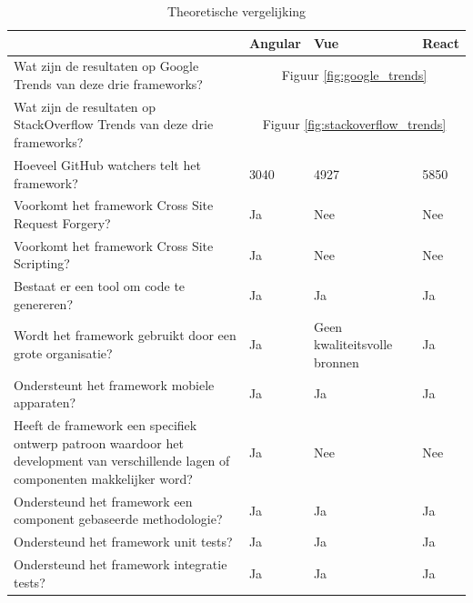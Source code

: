 \begin{table}[h]
	\centering
	\caption{Theoretische vergelijking}
	\label{table:theoretische_vergelijking}
	\begin{tabular}{|p{7cm}||p{2cm}|p{2cm}|p{2cm}|}
		\hline
		&Angular &Vue   &React \\ \hline \hline
		Wat zijn de resultaten op Google Trends van deze drie frameworks?
		&\multicolumn{3}{c|}{Figuur \ref{fig:google_trends}}\\ \hline
		Wat zijn de resultaten op StackOverflow Trends van deze drie frameworks?
		&\multicolumn{3}{c|}{Figuur \ref{fig:stackoverflow_trends}}\\ \hline
		Hoeveel GitHub watchers telt het framework? \autocite{github_front-end_????} 
		&3040     &4927  &5850 \\ \hline
		Voorkomt het framework Cross Site Request Forgery? \autocite{_angular_2018-1}
		&Ja         &Nee    &Nee \\ \hline
		Voorkomt het framework Cross Site Scripting? \autocite{_angular_2018-1}
		&Ja         &Nee    &Nee \\ \hline
		Bestaat er een tool om code te genereren?
		&Ja         &Ja     &Ja       \\ \hline
		Wordt het framework gebruikt door een grote organisatie? \autocite{_made_????} \autocite{_made_????-1}
		&Ja         &Geen kwaliteitsvolle bronnen &Ja \\ \hline
		Ondersteunt het framework mobiele apparaten?
		&Ja         &Ja     &Ja       \\ \hline
		Heeft de framework een specifiek ontwerp patroon waardoor het development van verschillende lagen of componenten makkelijker word?
		&Ja         &Nee   &Nee       \\ \hline
		Ondersteund het framework een component gebaseerde methodologie?
		&Ja         &Ja     &Ja       \\ \hline
		Ondersteund het framework unit tests? \autocite{_testing_2018} \autocite{_testing_2018-2} \autocite{_testing_2018-1}
		&Ja         &Ja     &Ja       \\ \hline
		Ondersteund het framework integratie tests?
		&Ja         &Ja     &Ja      \\  \hline
	\end{tabular}
\end{table}

